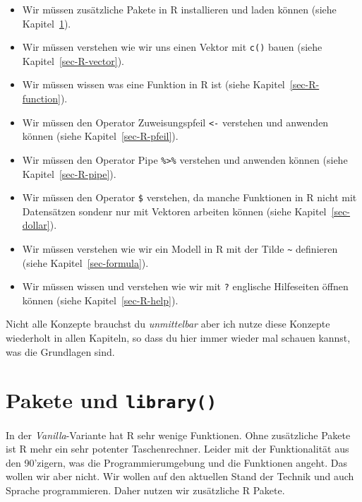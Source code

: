 \documentclass[
  letterpaper,
  DIV=11,
  oneside]{scrreport}
\providecommand{\tightlist}{%
  \setlength{\itemsep}{0pt}\setlength{\parskip}{0pt}}\usepackage{longtable,booktabs,array}
\begin{document}
\begin{itemize}
\tightlist
\item
  Wir müssen zusätzliche Pakete in R installieren und laden können
  (siehe Kapitel~\ref{sec-R-packages}).
\item
  Wir müssen verstehen wie wir uns einen Vektor mit \texttt{c()} bauen
  (siehe Kapitel~\ref{sec-R-vector}).
\item
  Wir müssen wissen was eine Funktion in R ist (siehe
  Kapitel~\ref{sec-R-function}).
\item
  Wir müssen den Operator Zuweisungspfeil \texttt{\textless{}-}
  verstehen und anwenden können (siehe Kapitel~\ref{sec-R-pfeil}).
\item
  Wir müssen den Operator Pipe \texttt{\%\textgreater{}\%} verstehen und
  anwenden können (siehe Kapitel~\ref{sec-R-pipe}).
\item
  Wir müssen den Operator \texttt{\$} verstehen, da manche Funktionen in
  R nicht mit Datensätzen sondenr nur mit Vektoren arbeiten können
  (siehe Kapitel~\ref{sec-dollar}).
\item
  Wir müssen verstehen wie wir ein Modell in R mit der Tilde
  \texttt{\textasciitilde{}} definieren (siehe
  Kapitel~\ref{sec-formula}).
\item
  Wir müssen wissen und verstehen wie wir mit \texttt{?} englische
  Hilfeseiten öffnen können (siehe Kapitel~\ref{sec-R-help}).
\end{itemize}

Nicht alle Konzepte brauchst du \emph{unmittelbar} aber ich nutze diese
Konzepte wiederholt in allen Kapiteln, so dass du hier immer wieder mal
schauen kannst, was die Grundlagen sind.

\hypertarget{sec-R-packages}{%
\section{\texorpdfstring{Pakete und
\texttt{library()}}{Pakete und library()}}\label{sec-R-packages}}

{}

In der \emph{Vanilla}-Variante hat R sehr wenige Funktionen. Ohne
zusätzliche Pakete ist R mehr ein sehr potenter Taschenrechner. Leider
mit der Funktionalität aus den 90'zigern, was die Programmierumgebung
und die Funktionen angeht. Das wollen wir aber nicht. Wir wollen auf den
aktuellen Stand der Technik und auch Sprache programmieren. Daher nutzen
wir zusätzliche R Pakete.
\end{document}
